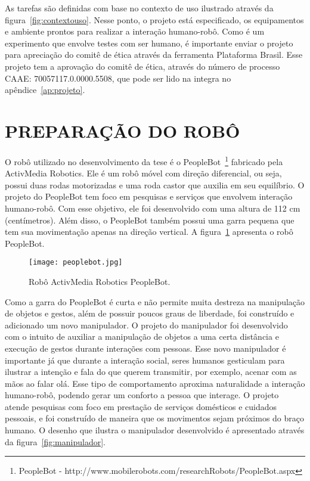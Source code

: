 As tarefas são definidas com base no contexto de uso ilustrado através da figura~\ref{fig:contextouso}. Nesse ponto, o projeto está especificado, os equipamentos e ambiente prontos para realizar a interação humano-robô. Como é um experimento que envolve testes com ser humano, é importante enviar o projeto para apreciação do comitê de ética através da ferramenta Plataforma Brasil. Esse projeto tem a aprovação do comitê de ética, através do número de processo CAAE: 70057117.0.0000.5508, que pode ser lido na integra no apêndice~\ref{ap:projeto}.

\section{PREPARAÇÃO DO ROBÔ}
\label{sec:ec_robo}
O robô utilizado no desenvolvimento da tese é o PeopleBot~\footnote{PeopleBot - http://www.mobilerobots.com/researchRobots/PeopleBot.aspx} fabricado pela ActivMedia Robotics. Ele é um robô móvel com direção diferencial, ou seja, possui duas rodas motorizadas e uma roda castor que auxilia em seu equilíbrio. O projeto do PeopleBot tem foco em pesquisas e serviços que envolvem interação humano-robô. Com esse objetivo, ele foi desenvolvido com uma altura de 112 cm (centímetros). Além disso, o PeopleBot também possui uma garra pequena que tem sua movimentação apenas na direção vertical. A figura~\ref{fig:peoplebot} apresenta o robô PeopleBot.

\begin{figure}[ht!]
	\centering
	\begin{minipage}{\textwidth}
		\caption{Robô ActivMedia Robotics PeopleBot.}
		\texttt{[image: peoplebot.jpg]}
		\label{fig:peoplebot}
	\end{minipage}
\end{figure}

Como a garra do PeopleBot é curta e não permite muita destreza na manipulação de objetos e gestos, além de possuir poucos graus de liberdade, foi construído e adicionado um novo manipulador. O projeto do manipulador foi desenvolvido com o intuito de auxiliar a manipulação de objetos a uma certa distância e execução de gestos durante interações com pessoas. Esse novo manipulador é importante já que durante a interação social, seres humanos gesticulam para ilustrar a intenção e fala do que querem transmitir, por exemplo, acenar com as mãos ao falar olá. Esse tipo de comportamento aproxima naturalidade a interação humano-robô, podendo gerar um conforto a pessoa que interage. O projeto atende pesquisas com foco em prestação de serviços domésticos e cuidados pessoais, e foi construído de maneira que os movimentos sejam próximos do braço humano. O desenho que ilustra o manipulador desenvolvido é apresentado através da figura~\ref{fig:manipulador}. 

